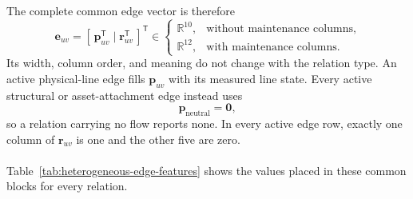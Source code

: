 The complete common edge vector is therefore
\begin{equation}
  \mathbf{e}_{uv}
  = [\,\mathbf{p}_{uv}^{\mathsf T}\mid
       \mathbf{r}_{uv}^{\mathsf T}\,]^{\mathsf T}
  \in
  \begin{cases}
    \mathbb{R}^{10}, & \text{without maintenance columns},\\
    \mathbb{R}^{12}, & \text{with maintenance columns}.
  \end{cases}
  \label{eq:heterogeneous-common-edge-vector}
\end{equation}
Its width, column order, and meaning do not change with the relation type. An
active physical-line edge fills \(\mathbf{p}_{uv}\) with its measured line
state. Every active structural or asset-attachment edge instead uses
\begin{equation}
  \mathbf{p}_{\mathrm{neutral}}
  = \mathbf{0},
  \label{eq:heterogeneous-neutral-edge-physical-block}
\end{equation}
so a relation carrying no flow reports none. In every active edge row,
exactly one column of \(\mathbf{r}_{uv}\) is one and the other five are zero.\\
\\
Table~\ref{tab:heterogeneous-edge-features} shows the values placed in these
common blocks for every relation.

